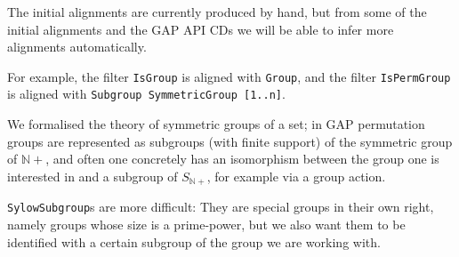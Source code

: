 The initial alignments are currently produced by hand, but from some of the
initial alignments and the GAP API CDs we will be able to infer more alignments
automatically.

For example, the filter \texttt{IsGroup} is aligned with \texttt{Group}, and the
filter \texttt{IsPermGroup} is aligned with \texttt{Subgroup SymmetricGroup
  [1..n]}.

We formalised the theory of symmetric groups of a set; in GAP permutation groups
are represented as subgroups (with finite support) of the symmetric group of
$\mathbb{N}+$, and often one concretely has an isomorphism between the group one
is interested in and a subgroup of $S_{\mathbb{N}+}$, for example
via a group action.

\texttt{SylowSubgroup}s are more difficult: They are special groups in their
own right, namely groups whose size is a prime-power, but we also want them
to be identified with a certain subgroup of the group we are working
with.



